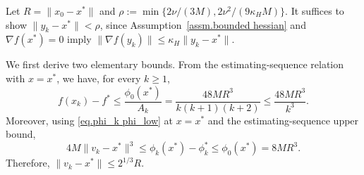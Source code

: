 \documentclass[moor,sglanonrev]{informs4}
\begin{document}
\begin{APPENDICES}
    {\color{red}
        Let $R=\|x_0-x^*\|$ and
        \(\rho:=\min\{2\nu/(3M),2\nu^2/(9\kappa_HM)\}\).
        It suffices to show $\|y_k-x^*\|<\rho$, since Assumption~\ref{assm.bounded hessian} and
        $\nabla f(x^*)=0$ imply
        \(\|\nabla f(y_k)\|\leq \kappa_H\|y_k-x^*\|\).

        We first derive two elementary bounds. From the estimating-sequence relation with
        $x=x^*$, we have, for every $k\geq1$,
        \[
            f(x_k)-f^*
            \leq \frac{\phi_0(x^*)}{A_k}
            = \frac{48MR^3}{k(k+1)(k+2)}
            \leq \frac{48MR^3}{k^3}.
        \]
        Moreover, using \eqref{eq.phi_k phi_low} at $x=x^*$ and the estimating-sequence
        upper bound,
        \[
            4M\|v_k-x^*\|^3
            \leq \phi_k(x^*)-\phi_k^*
            \leq \phi_0(x^*)
            =8MR^3.
        \]
        Therefore,
        \(
        \|v_k-x^*\|\leq 2^{1/3}R.
        \)

}
\end{APPENDICES}
\end{document}
